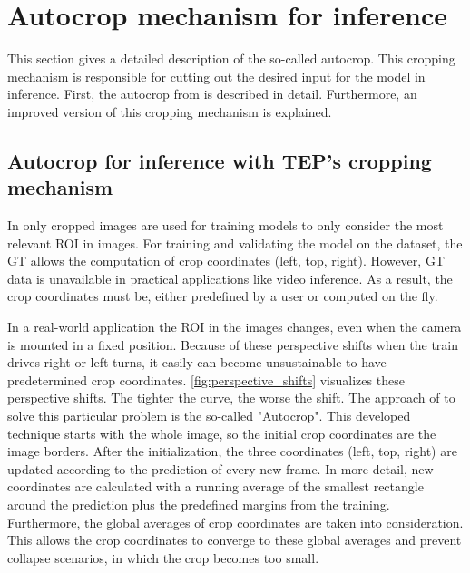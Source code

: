 \section{Autocrop mechanism for inference}
\label{sec:autocrop}

This section gives a detailed description of the so-called autocrop.
This cropping mechanism is responsible for cutting out the desired input for the model in inference.
First, the autocrop from \cite{tepNet2024} is described in detail.
Furthermore, an improved version of this cropping mechanism is explained.

\subsection{Autocrop for inference with TEP's cropping mechanism}

In \cite{tepNet2024} only cropped images are used for training models to only consider the most relevant \ac{ROI} in images.
For training and validating the model on the dataset, the \ac{GT} allows the computation of crop coordinates (left, top, right).
However, \ac{GT} data is unavailable in practical applications like video inference.
As a result, the crop coordinates must be, either predefined by a user or computed on the fly.

In a real-world application the ROI in the images changes, even when the camera is mounted in a fixed position.
Because of these perspective shifts when the train drives right or left turns, it easily can become unsustainable to have predetermined crop coordinates.
\autoref{fig:perspective_shifts} visualizes these perspective shifts.
The tighter the curve, the worse the shift.
The approach of \cite{tepNet2024} to solve this particular problem is the so-called "Autocrop".
This developed technique starts with the whole image, so the initial crop coordinates are the image borders.
After the initialization, the three coordinates (left, top, right) are updated according to the prediction of every new frame.
In more detail, new coordinates are calculated with a running average of the smallest rectangle around the prediction plus the predefined margins from the training.
Furthermore, the global averages of crop coordinates are taken into consideration.
This allows the crop coordinates to converge to these global averages and prevent collapse scenarios, in which the crop becomes too small.


